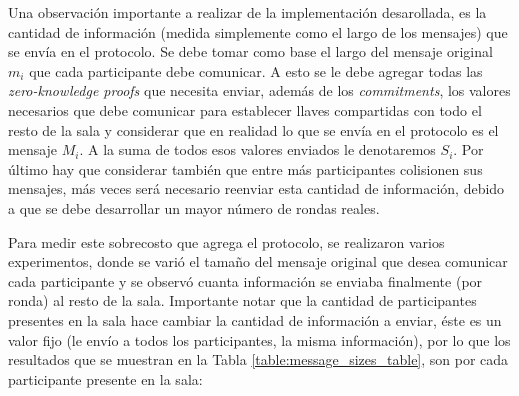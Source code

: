 {Una observación importante a realizar de la implementación desarollada, es la 
cantidad de información (medida simplemente como el largo de los mensajes) que 
se envía en el protocolo. Se debe tomar como base el largo del mensaje 
original $m_i$ que cada participante debe comunicar. A esto se le debe agregar 
todas las \emph{zero-knowledge proofs} que necesita enviar, además de los \emph
{commitments}, los valores necesarios que debe comunicar para establecer 
llaves compartidas con todo el resto de la sala y considerar que en realidad 
lo que se envía en el protocolo es el mensaje $M_i$. A la suma de todos esos 
valores enviados le denotaremos $S_i$. Por último hay que considerar también 
que entre más participantes colisionen sus mensajes, más veces será necesario 
reenviar esta cantidad de información, debido a que se debe desarrollar un 
mayor número de rondas reales.

Para medir este sobrecosto que agrega el protocolo, se realizaron varios 
experimentos, donde se varió el tamaño del mensaje original que desea 
comunicar cada participante y se observó cuanta información se enviaba 
finalmente (por ronda) al resto de la sala. Importante notar que la cantidad 
de participantes presentes en la sala hace cambiar la cantidad de información a 
enviar, éste es un valor fijo (le envío a todos los participantes, la misma 
información), por lo que los resultados que se muestran en la Tabla \ref{table:message_sizes_table}, 
son por cada participante presente en la sala:

}
